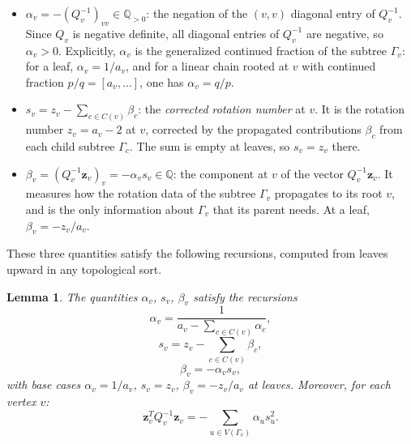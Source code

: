 \documentclass[11pt]{amsart}
\theoremstyle{plain}
\newtheorem{lemma}[theorem]{Lemma}
\theoremstyle{definition}
\theoremstyle{remark}
\newcommand{\dfn}[1]{{\em #1}}
\newcommand{\Q}{\mathbb{Q}}
\begin{document}
\begin{itemize}
\item $\alpha_v=-(Q_v^{-1})_{vv}\in\Q_{>0}$: the negation of the
      $(v,v)$ diagonal entry of $Q_v^{-1}$. Since $Q_v$ is negative
      definite, all diagonal entries of $Q_v^{-1}$ are negative, so
      $\alpha_v>0$. Explicitly, $\alpha_v$ is the generalized
      continued fraction of the subtree $\Gamma_v$: for a leaf,
      $\alpha_v=1/a_v$, and for a linear chain rooted at $v$ with
      continued fraction $p/q=[a_v,\dots]$, one has $\alpha_v=q/p$.

\item $s_v=z_v-\sum_{c\in C(v)}\beta_c$: the \dfn{corrected rotation
      number} at $v$. It is the rotation number $z_v=a_v-2$ at $v$,
      corrected by the propagated contributions $\beta_c$ from each
      child subtree $\Gamma_c$. The sum is empty at leaves, so
      $s_v=z_v$ there.

\item $\beta_v=(Q_v^{-1}\mathbf{z}_v)_v=-\alpha_v s_v\in\Q$: the
      component at $v$ of the vector $Q_v^{-1}\mathbf{z}_v$. It
      measures how the rotation data of the subtree $\Gamma_v$
      propagates to its root $v$, and is the only information about
      $\Gamma_v$ that its parent needs. At a leaf,
      $\beta_v=-z_v/a_v$.
\end{itemize}

These three quantities satisfy the following recursions, computed
from leaves upward in any topological sort.

\begin{lemma}\label{lem:tree-recursion}
The quantities $\alpha_v$, $s_v$, $\beta_v$ satisfy the recursions
\begin{equation}\label{eq:alpha-recursion}
\alpha_v
=\frac{1}{a_v-\displaystyle\sum_{c\in C(v)}\alpha_c},
\end{equation}
\begin{equation}\label{eq:s-recursion}
s_v=z_v-\sum_{c\in C(v)}\beta_c,
\end{equation}
\begin{equation}\label{eq:beta-recursion}
\beta_v=-\alpha_v s_v,
\end{equation}
with base cases $\alpha_v=1/a_v$, $s_v=z_v$, $\beta_v=-z_v/a_v$ at
leaves. Moreover, for each vertex $v$:
\begin{equation}\label{eq:quadratic-recursion}
\mathbf{z}_v^TQ_v^{-1}\mathbf{z}_v
=
-\sum_{u\in V(\Gamma_v)}\alpha_u s_u^2.
\end{equation}
\end{lemma}
\end{document}
